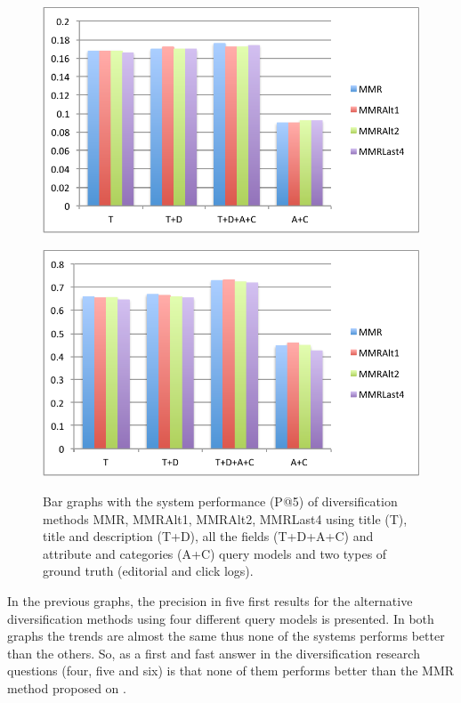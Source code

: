 \begin{figure}[H]
\centering
\begin{minipage}{.5\textwidth}
	\includegraphics[width=.9\linewidth]{../images/MMRMethodsP@5.pdf}
	\label{fig:acc-ns}
\end{minipage}%
\begin{minipage}{.5\textwidth}
	\centering
	\includegraphics[width=.9\linewidth]{../images/MMRMethodsP@5Relevance.pdf}
	\label{fig:acc-ns}
\end{minipage}%
\caption{Bar graphs with the system performance (P@5) of diversification methods MMR, MMRAlt1, MMRAlt2, MMRLast4 using title (T), title and description (T+D), all the fields (T+D+A+C) and attribute and categories (A+C) query models and two types of ground truth (editorial and click logs).
}
\end{figure}


In the previous graphs, the precision in five first results for the alternative diversification methods using four different query models is presented. In both graphs the trends are almost the same thus none of the systems performs better than the others. So, as a first and fast answer in the diversification research questions (four, five and six) is that none of them performs better than the MMR method proposed on \cite{CarbonellGoldstein}.


